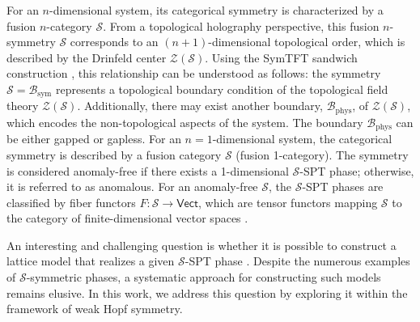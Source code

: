 \documentclass[a4paper,11pt]{article}
\theoremstyle{theorem}
\theoremstyle{remark}
\begin{document}
For an \( n \)-dimensional system, its categorical symmetry is characterized by a fusion \( n \)-category \( \mathcal{S} \). From a topological holography perspective, this fusion \( n \)-symmetry \( \mathcal{S} \) corresponds to an \( (n+1) \)-dimensional topological order, which is described by the Drinfeld center \( \mathcal{Z}(\mathcal{S}) \). Using the SymTFT sandwich construction \cite{Kong2020algebraic, SchaferNameki2024ICTP, huang2023topologicalholo, bhardwaj2024lattice, freed2024topSymTFT, gaiotto2021orbifold, bhardwaj2023generalizedcharge, apruzzi2023symmetry, bhardwaj2024gappedphases, Zhang2024anomaly, Ji2020categoricalsym,bhardwaj2024clubsandwich,bhardwaj2024hassediagramsgaplessspt}, this relationship can be understood as follows: the symmetry \( \mathcal{S} = \mathcal{B}_{\text{sym}} \) represents a topological boundary condition of the topological field theory \( \mathcal{Z}(\mathcal{S}) \). Additionally, there may exist another boundary, \( \mathcal{B}_{\text{phys}} \), of \( \mathcal{Z}(\mathcal{S}) \), which encodes the non-topological aspects of the system. The boundary \( \mathcal{B}_{\text{phys}} \) can be either gapped or gapless.
For an \( n = 1 \)-dimensional system, the categorical symmetry is described by a fusion category \( \mathcal{S} \) (fusion 1-category). The symmetry is considered anomaly-free if there exists a 1-dimensional \( \mathcal{S} \)-SPT phase; otherwise, it is referred to as anomalous. For an anomaly-free \( \mathcal{S} \), the \( \mathcal{S} \)-SPT phases are classified by fiber functors \( F: \mathcal{S} \to \mathsf{Vect} \), which are tensor functors mapping \( \mathcal{S} \) to the category of finite-dimensional vector spaces \cite{thorngren2019fusion}.


An interesting and challenging question is whether it is possible to construct a lattice model that realizes a given \( \mathcal{S} \)-SPT phase \cite{aasen2016topological, aasen2020topological, inamura2022lattice, Inamura2024fusionSuface, eck2024generalizationskitaevshoneycombmodel, fechisin2023noninvertible, bhardwaj2024lattice, bhardwaj2024gappedphases, Feiguin2007interacting, trebst2008short, buican2017anyonic, Lootens2023dualityHamiltonian, Lootens2024duality, Seiberg2024noninvertible, Seifnashri2024cluster, inamura202411dsptphasesfusion, cordova2024noninvertiblesymmetriesfinitegroup}. Despite the numerous examples of \( \mathcal{S} \)-symmetric phases, a systematic approach for constructing such models remains elusive. In this work, we address this question by exploring it within the framework of weak Hopf symmetry.
\end{document}
